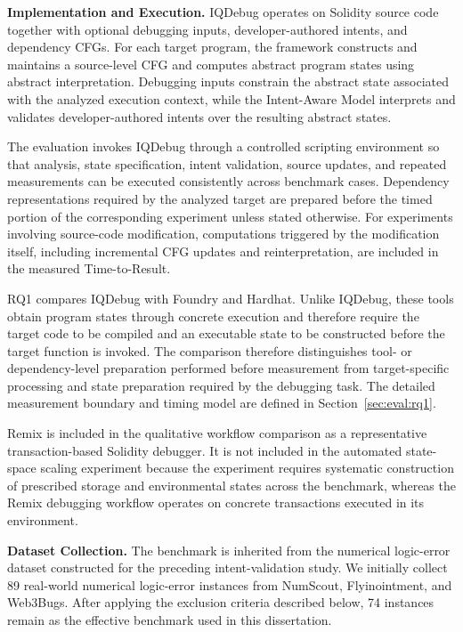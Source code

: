 \documentclass[11pt,oneside]{report}
\theoremstyle{plain}
\theoremstyle{definition}
\theoremstyle{remark}
\begin{document}
\smallskip
\noindent\textbf{Implementation and Execution.}
IQDebug operates on Solidity source code together with optional debugging inputs, developer-authored intents, and dependency CFGs.
For each target program, the framework constructs and maintains a source-level CFG and computes abstract program states using abstract interpretation.
Debugging inputs constrain the abstract state associated with the analyzed execution context, while the Intent-Aware Model interprets and validates developer-authored intents over the resulting abstract states.

The evaluation invokes IQDebug through a controlled scripting environment so that analysis, state specification, intent validation, source updates, and repeated measurements can be executed consistently across benchmark cases.
Dependency representations required by the analyzed target are prepared before the timed portion of the corresponding experiment unless stated otherwise.
For experiments involving source-code modification, computations triggered by the modification itself, including incremental CFG updates and reinterpretation, are included in the measured Time-to-Result.

RQ1 compares IQDebug with Foundry and Hardhat.
Unlike IQDebug, these tools obtain program states through concrete execution and therefore require the target code to be compiled and an executable state to be constructed before the target function is invoked.
The comparison therefore distinguishes tool- or dependency-level preparation performed before measurement from target-specific processing and state preparation required by the debugging task.
The detailed measurement boundary and timing model are defined in Section~\ref{sec:eval:rq1}.

Remix is included in the qualitative workflow comparison as a representative transaction-based Solidity debugger.
It is not included in the automated state-space scaling experiment because the experiment requires systematic construction of prescribed storage and environmental states across the benchmark, whereas the Remix debugging workflow operates on concrete transactions executed in its environment.

\smallskip
\noindent\textbf{Dataset Collection.}
The benchmark is inherited from the numerical logic-error dataset constructed for the preceding intent-validation study.
We initially collect 89 real-world numerical logic-error instances from NumScout, Flyinointment, and Web3Bugs.
After applying the exclusion criteria described below, 74 instances remain as the effective benchmark used in this dissertation.
\end{document}
